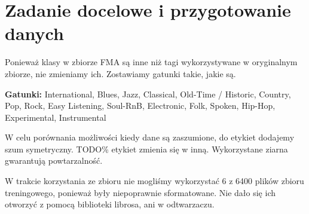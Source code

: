 \section{Zadanie docelowe i przygotowanie danych}

Ponieważ klasy w zbiorze FMA są inne niż tagi wykorzystywane w oryginalnym zbiorze, nie zmieniamy ich. Zostawiamy gatunki takie, jakie są.

\textbf{Gatunki:} International, Blues, Jazz, Classical, Old-Time / Historic, Country, Pop, Rock, Easy Listening, Soul-RnB, Electronic, Folk, Spoken, Hip-Hop, Experimental, Instrumental

W celu porównania możliwości kiedy dane są zaszumione, do etykiet dodajemy szum symetryczny. TODO\% etykiet zmienia się w inną. Wykorzystane ziarna gwarantują powtarzalność.

W trakcie korzystania ze zbioru nie mogliśmy wykorzystać 6 z 6400 plików zbioru treningowego, ponieważ były niepoprawnie sformatowane. Nie dało się ich otworzyć z pomocą biblioteki librosa, ani w odtwarzaczu.
